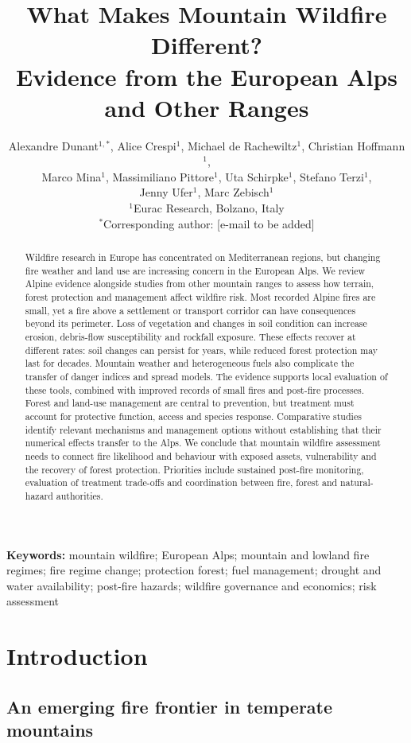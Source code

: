 \documentclass[11pt,a4paper]{article}
\title{
What Makes Mountain Wildfire Different?\\
Evidence from the European Alps and Other Ranges
}
\author{
Alexandre Dunant$^{1,*}$, Alice Crespi$^{1}$, Michael de Rachewiltz$^{1}$, Christian Hoffmann$^{1}$,\\
Marco Mina$^{1}$, Massimiliano Pittore$^{1}$, Uta Schirpke$^{1}$, Stefano Terzi$^{1}$,\\
Jenny Ufer$^{1}$, Marc Zebisch$^{1}$ \\
\small $^{1}$Eurac Research, Bolzano, Italy \\
\small $^{*}$Corresponding author: [e-mail to be added]
}
\date{}
\begin{document}
\maketitle


\begin{abstract}
\noindent
Wildfire research in Europe has concentrated on Mediterranean regions, but changing fire weather and land use are increasing concern in the European Alps. We review Alpine evidence alongside studies from other mountain ranges to assess how terrain, forest protection and management affect wildfire risk. Most recorded Alpine fires are small, yet a fire above a settlement or transport corridor can have consequences beyond its perimeter. Loss of vegetation and changes in soil condition can increase erosion, debris-flow susceptibility and rockfall exposure. These effects recover at different rates: soil changes can persist for years, while reduced forest protection may last for decades. Mountain weather and heterogeneous fuels also complicate the transfer of danger indices and spread models. The evidence supports local evaluation of these tools, combined with improved records of small fires and post-fire processes. Forest and land-use management are central to prevention, but treatment must account for protective function, access and species response. Comparative studies identify relevant mechanisms and management options without establishing that their numerical effects transfer to the Alps. We conclude that mountain wildfire assessment needs to connect fire likelihood and behaviour with exposed assets, vulnerability and the recovery of forest protection. Priorities include sustained post-fire monitoring, evaluation of treatment trade-offs and coordination between fire, forest and natural-hazard authorities.
\end{abstract}

\noindent\textbf{Keywords:}
mountain wildfire; European Alps; mountain and lowland fire regimes; fire regime change; protection forest; fuel management; drought and water availability; post-fire hazards; wildfire governance and economics; risk assessment


\section{Introduction}
\label{sec:intro}

\subsection{An emerging fire frontier in temperate mountains}
\end{document}
